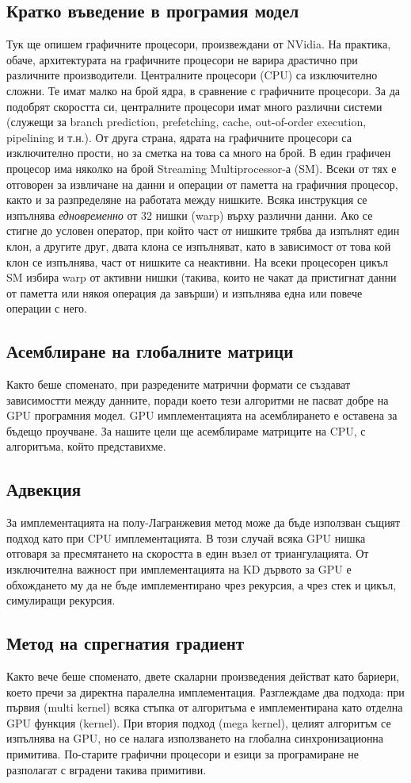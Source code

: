 \documentclass[12pt]{report}
\begin{document}
\subsection{Кратко въведение в програмия модел}
Тук ще опишем графичните процесори, произвеждани от NVidia. На практика, обаче, архитектурата на графичните процесори не варира драстично при различните производители. Централните процесори (CPU) са изключително сложни. Те имат малко на брой ядра, в сравнение с графичните процесори. За да подобрят скоростта си, централните процесори имат много различни системи (служещи за branch prediction, prefetching, cache, out-of-order execution, pipelining и т.н.). От друга страна, ядрата на графичните процесори са изключително прости, но за сметка на това са много на брой. В един графичен процесор има няколко на брой Streaming Multiprocessor-а (SM). Всеки от тях е отговорен за извличане на данни и операции от паметта на графичния процесор, както и за разпределяне на работата между нишките. Всяка инструкция се изпълнява \textit{едновременно} от 32 нишки (warp) върху различни данни. Ако се стигне до условен оператор, при който част от нишките трябва да изпълнят един клон, а другите друг, двата клона се изпълняват, като в зависимост от това кой клон се изпълнява, част от нишките са неактивни. На всеки процесорен цикъл SM избира warp от активни нишки (такива, които не чакат да пристигнат данни от паметта или някоя операция да завърши) и изпълнява една или повече операции с него.  
\subsection{Асемблиране на глобалните матрици}
Както беше споменато, при разредените матрични формати се създават зависимостти между данните, поради което тези алгоритми не пасват добре на GPU програмния модел. GPU имплементацията на асемблирането е оставена за бъдещо проучване. За нашите цели ще асемблираме матриците на CPU, с алгоритъма, който представихме.
\subsection{Адвекция}
За имплементацията на полу-Лагранжевия метод може да бъде използван същият подход като при CPU имплементацията. В този случай всяка GPU нишка отговаря за пресмятането на скоростта в един възел от триангулацията. От изключителна важност при имплементацията на KD дървото за GPU е обхождането му да не бъде имплементирано чрез рекурсия, а чрез стек и цикъл, симулиращи рекурсия. 
\subsection{Метод на спрегнатия градиент}
Както вече беше споменато, двете скаларни произведения действат като бариери, което пречи за директна паралелна имплементация. Разглеждаме два подхода: при първия (multi kernel) всяка стъпка от алгоритъма е имплементирана като отделна GPU функция (kernel). При втория подход (mega kernel), целият алгоритъм се изпълнява на GPU, но се налага използването на глобална синхронизационна примитива. По-старите графични процесори и езици за програмиране не разполагат с вградени такива примитиви.
\end{document}
